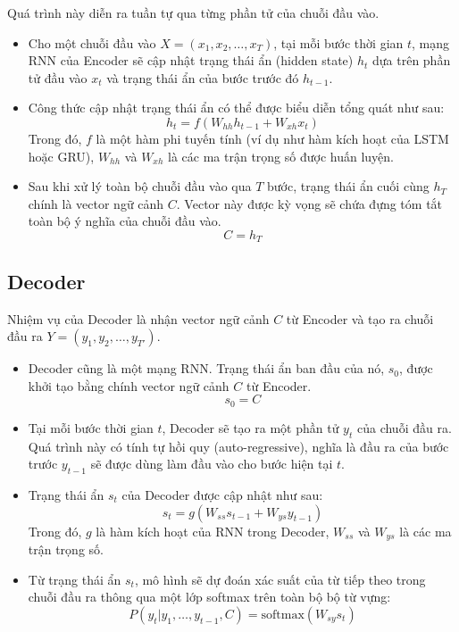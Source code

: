 Quá trình này diễn ra tuần tự qua từng phần tử của chuỗi đầu vào.
\begin{itemize}
    \item Cho một chuỗi đầu vào $X = (x_1, x_2, \dots, x_T)$, tại mỗi bước thời gian $t$, mạng RNN của Encoder sẽ cập nhật trạng thái ẩn (hidden state) $h_t$ dựa trên phần tử đầu vào $x_t$ và trạng thái ẩn của bước trước đó $h_{t-1}$.
    \item Công thức cập nhật trạng thái ẩn có thể được biểu diễn tổng quát như sau:
    \begin{equation}
        h_t = f(W_{hh}h_{t-1} + W_{xh}x_t)
    \end{equation}
    Trong đó, $f$ là một hàm phi tuyến tính (ví dụ như hàm kích hoạt của LSTM hoặc GRU), $W_{hh}$ và $W_{xh}$ là các ma trận trọng số được huấn luyện.
    \item Sau khi xử lý toàn bộ chuỗi đầu vào qua $T$ bước, trạng thái ẩn cuối cùng $h_T$ chính là vector ngữ cảnh $C$. Vector này được kỳ vọng sẽ chứa đựng tóm tắt toàn bộ ý nghĩa của chuỗi đầu vào.
    \begin{equation}
        C = h_T
    \end{equation}
\end{itemize}

\subsection{Decoder}
Nhiệm vụ của Decoder là nhận vector ngữ cảnh $C$ từ Encoder và tạo ra chuỗi đầu ra $Y = (y_1, y_2, \dots, y_{T'})$.

\begin{itemize}
    \item Decoder cũng là một mạng RNN. Trạng thái ẩn ban đầu của nó, $s_0$, được khởi tạo bằng chính vector ngữ cảnh $C$ từ Encoder.
    \begin{equation}
        s_0 = C
    \end{equation}
    \item Tại mỗi bước thời gian $t$, Decoder sẽ tạo ra một phần tử $y_t$ của chuỗi đầu ra. Quá trình này có tính tự hồi quy (auto-regressive), nghĩa là đầu ra của bước trước $y_{t-1}$ sẽ được dùng làm đầu vào cho bước hiện tại $t$.
    \item Trạng thái ẩn $s_t$ của Decoder được cập nhật như sau:
    \begin{equation}
        s_t = g(W_{ss}s_{t-1} + W_{ys}y_{t-1})
    \end{equation}
    Trong đó, $g$ là hàm kích hoạt của RNN trong Decoder, $W_{ss}$ và $W_{ys}$ là các ma trận trọng số.
    \item Từ trạng thái ẩn $s_t$, mô hình sẽ dự đoán xác suất của từ tiếp theo trong chuỗi đầu ra thông qua một lớp softmax trên toàn bộ bộ từ vựng:
    \begin{equation}
        P(y_t | y_1, \dots, y_{t-1}, C) = \text{softmax}(W_{sy}s_t)
    \end{equation}
\end{itemize}

